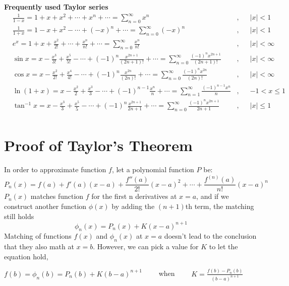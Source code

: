 \documentclass[11pt]{article}
\begin{document}
\begin{tcolorbox}[
	enhanced, 
	width=\textwidth, 
	fontupper=\normalsize,%
	drop fuzzy shadow southwest,
	boxrule=0.4pt,
	sharp corners,
	colframe=yellow!80!black,
	colback=yellow!10]
	
\textbf{\color{RoyalBlue} Frequently used Taylor series} 
$$
\begin{aligned}
& \frac{1}{1-x} = 1 + x + x^2 + \cdots + x^n + \cdots = \sum ^\infty _{n=0} x^n  &,  && |x| < 1 \\
& \frac{1}{1+x} = 1 - x + x^2 - \cdots + (-x)^n + \cdots = \sum ^\infty _{n=0} (-x)^n  &,  && |x| < 1 \\
& e^x = 1 + x + \frac{x^2}{2!} + \cdots + \frac{x^n}{n!} + \cdots = \sum ^\infty _{n=0} \frac{x^n}{n!}  &,  && |x| < \infty \\
& \sin x = x - \frac{x^3}{3!} + \frac{x^5}{5!} - \cdots + (-1)^n \frac{x^{2n+1}}{(2n+1)!} + \cdots = \sum ^\infty _{n=0} \frac{(-1)^n x^{2n+1} }{(2n+1)!}  &,  && |x| < \infty \\
& \cos x = x - \frac{x^2}{2!} + \frac{x^4}{4!} - \cdots + (-1)^{n} \frac{x^{2n}}{(2n)!} + \cdots = \sum ^\infty _{n=0} \frac{(-1)^n x^{2n} }{(2n)!}  &,  && |x| < \infty \\
& \ln (1+x) = x - \frac{x^2}{2} + \frac{x^3}{3} - \cdots + (-1)^{n-1} \frac{x^n}{n} + \cdots = \sum ^\infty _{n=1} \frac{(-1)^{n-1} x^n}{n} &,  && -1<x \leqslant 1 \\
& \tan^{-1} x = x - \frac{x^3}{3} + \frac{x^5}{5} - \cdots + (-1)^{n} \frac{x^{2n+1} } {2n+1} + \cdots = \sum ^\infty _{n=0} \frac{(-1)^n x^{2n+1} } {2n+1} &,  && |x| \leqslant 1 \\
\end{aligned}
$$
\end{tcolorbox}



\section{\large Proof of Taylor's Theorem}

In order to approximate function $f$,  let a polynomial function $P$ be:
$$
P_n (x) = f(a) + f'(a)(x-a) + \frac{f''(a)}{2!}(x-a)^2 + \cdots + \frac{f^{(n)} (a) }{n!} (x-a)^n
$$
$P_n(x)$ matches function $f$ for the first n derivatives at $x=a$,  and if we construct another function $\phi (x)$ by adding the $(n+1)$th term,  the matching still holds
$$
\phi _n (x) = P_n (x) + K (x-a)^{n+1}
$$
Matching of functions $f(x)$ and $\phi _n (x)$ at $x=a$ doesn't lead to the conclusion that they also math at $x=b$.  However,  we can pick a value for $K$ to let the equation hold,
\begin{center}
$f(b) = \phi _n (b) = P_n(b) + K(b-a)^{n+1} $  \ \ \ \ when  \ \ \ \ $K = \frac{f(b) - P_n (b)}{(b-a)^{n+1} }$
\end{center}
\end{document}
